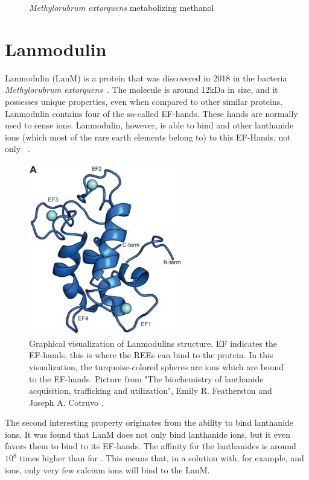 \begin{enumerate}
\begin{figure}[H]
        \caption{\emph{Methylorubrum extorquens} metabolizing methanol}
        \label{fig:mextorquens_metabolizing_methanol}
    \end{figure}
\end{enumerate}


\section{Lanmodulin\authorA}
Lanmodulin (LanM) is a protein that was discovered in 2018 in the bacteria \emph{Methylorubrum extorquens}~\cite{lanmdiscovery}.
The molecule is around 12kDa in size, and it possesses unique properties, even when compared to other similar proteins.
Lanmodulin contains four of the so-called EF-hands.
These hands are normally used to sense  ions.
Lanmodulin, however, is able to bind  and other lanthanide ions (which most of the rare earth elements belong to) to this EF-Hands, not only ~\cite{lanmstructure}.

\begin{figure}[H]
    \centering
    \includegraphics[width=0.6\textwidth]{./media/images/lanm_structure}
    \caption{Graphical visualization of Lanmodulins structure. EF indicates the EF-hands, this is where the REEs can bind to the protein. In this visualization, the turquoise-colored spheres are  ions which are bound to the EF-hands. Picture from "The biochemistry of lanthanide acquisition, trafficking and utilization", Emily R. Featherston and Joseph A. Cotruvo \cite{lanmroleinbiology}.}
    \label{fig:lanm_structure2}
\end{figure}

The second interesting property originates from the ability to bind lanthanide ions.
It was found that LanM does not only bind lanthanide ions, but it even favors them to bind to its EF-hands.
The affinity for the lanthanides is around \(10^{8}\) times higher than for .
This means that, in a solution with, for example,  and  ions, only very few calcium ions will bind to the LanM.

